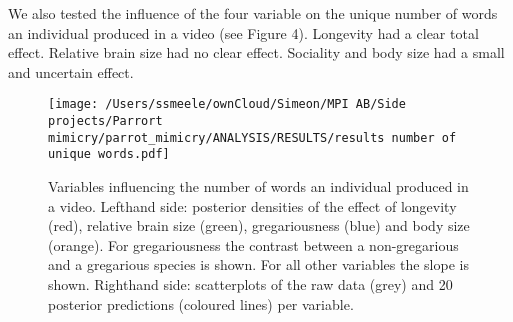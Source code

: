 \documentclass[
  11pt,
]{article}
\begin{document}
We also tested the influence of the four variable on the unique number
of words an individual produced in a video (see Figure 4). Longevity had
a clear total effect. Relative brain size had no clear effect. Sociality
and body size had a small and uncertain effect.

\begin{figure}
\centering
\texttt{[image: /Users/ssmeele/ownCloud/Simeon/MPI AB/Side projects/Parrort mimicry/parrot\_mimicry/ANALYSIS/RESULTS/results number of unique words.pdf]}
\caption{Variables influencing the number of words an individual
produced in a video. Lefthand side: posterior densities of the effect of
longevity (red), relative brain size (green), gregariousness (blue) and
body size (orange). For gregariousness the contrast between a
non-gregarious and a gregarious species is shown. For all other
variables the slope is shown. Righthand side: scatterplots of the raw
data (grey) and 20 posterior predictions (coloured lines) per variable.}
\end{figure}
\end{document}
